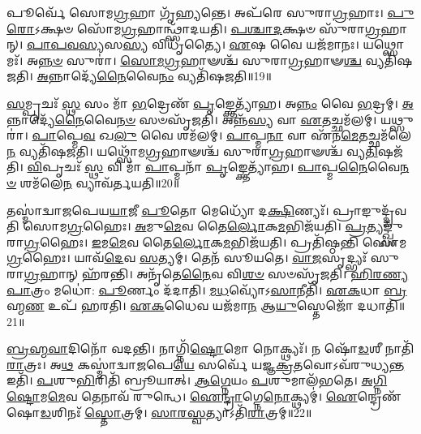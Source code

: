 𑌪𑍂𑌰𑍍𑌵𑍇᳴ 𑌸𑍋𑌮\-\ul{𑌗𑍍𑌰}\-𑌹𑌾 𑌗𑍃᳴𑌹𑍍𑌯𑌨𑍍𑌤𑍇।
𑌅𑌪᳴𑌰𑍇 𑌸𑍁𑌰𑌾\-\ul{𑌗𑍍𑌰}\-𑌹𑌾𑌃।
\-\ul{𑌪𑍁}\-\-\ul{𑌰𑍋}\-\-𑌽𑌕𑍍𑌷𑍞 𑌸𑍋᳴𑌮\-\ul{𑌗𑍍𑌰}\-𑌹𑌾𑌨𑍍𑌥𑍍𑌸𑌾᳴𑌦𑌯𑌤𑌿।
\-\ul{𑌪}\-\-\ul{𑌶𑍍𑌚𑌾}\-\-\ul{𑌦}\-𑌕𑍍𑌷𑍞 𑌸𑍁᳴𑌰𑌾\-\ul{𑌗𑍍𑌰}\-𑌹𑌾𑌨𑍍।
\-\ul{𑌪𑌾}\-\-\ul{𑌪}\-\-\ul{𑌵}\-\-\ul{𑌸𑍍𑌯}\-𑌸\-\ul{𑌸𑍍𑌯} 𑌵𑌿𑌧𑍃᳴𑌤𑍍𑌯𑍈।
\-\ul{𑌏}\-𑌷 𑌵𑍈 𑌯𑌜᳴𑌮𑌾𑌨𑌃।
𑌯𑌥𑍍𑌸𑍋𑌮𑌃᳴।
𑌅\-\ul{𑌨𑍍𑌨}\-\-\ul{𑍞} 𑌸𑍁𑌰𑌾॑।
\-\ul{𑌸𑍋}\-\-\ul{𑌮}\-\-\ul{𑌗𑍍𑌰}\-𑌹𑌾𑍟𑌶𑍍𑌚᳴ 𑌸𑍁𑌰𑌾\-\ul{𑌗𑍍𑌰}\-𑌹𑌾𑍟\-\ul{𑌶𑍍𑌚} 𑌵𑍍𑌯𑌤𑌿᳴𑌷𑌜𑌤𑌿।
\-\ul{𑌅}\-𑌨𑍍𑌨𑌾𑌦𑍍𑌯𑍇᳴\-\ul{𑌨𑍈}\-𑌵𑍈\-\ul{𑌨𑌂} 𑌵𑍍𑌯𑌤𑌿᳴𑌷𑌜𑌤𑌿॥19॥

\-\ul{𑌸}\-𑌮𑍍𑌪𑍃𑌚𑌃᳴ \ul{𑌸𑍍𑌥} 𑌸𑌂 𑌮𑌾᳴ \ul{𑌭}\-𑌦𑍍𑌰𑍇𑌣᳴ \ul{𑌪𑍃}\-𑌙𑍍𑌕𑍍𑌤𑍇𑌤𑍍𑌯𑌾᳴𑌹।
𑌅\-\ul{𑌨𑍍𑌨𑌂} 𑌵𑍈 \ul{𑌭}\-𑌦𑍍𑌰𑌮𑍍।
\-\ul{𑌅}\-𑌨𑍍𑌨𑌾𑌦𑍍𑌯𑍇᳴\-\ul{𑌨𑍈}\-𑌵𑍈\-\ul{𑌨}\-\-\ul{𑍞} 𑌸𑍞𑌸𑍃᳴𑌜𑌤𑌿।
𑌅𑌨𑍍𑌨᳴\-\ul{𑌸𑍍𑌯} 𑌵𑌾 \ul{𑌏}\-𑌤𑌚𑍍𑌛𑌮᳴𑌲𑌮𑍍।
𑌯𑌥𑍍𑌸𑍁𑌰𑌾॑।
\-\ul{𑌪𑌾}\-𑌪𑍍𑌮𑍇\-\ul{𑌵} 𑌖\-\ul{𑌲𑍁} 𑌵𑍈 𑌶𑌮᳴𑌲𑌮𑍍।
\-\ul{𑌪𑌾}\-𑌪𑍍𑌮\-\ul{𑌨𑌾} 𑌵𑌾 𑌏᳴𑌨\-\ul{𑌮𑍇}\-𑌤𑌚𑍍𑌛𑌮᳴𑌲𑍇\-\ul{𑌨} 𑌵𑍍𑌯𑌤𑌿᳴𑌷𑌜𑌤𑌿।
𑌯𑌥𑍍𑌸𑍋᳴𑌮\-\ul{𑌗𑍍𑌰}\-𑌹𑌾𑍟𑌶𑍍𑌚᳴ 𑌸𑍁𑌰𑌾\-\ul{𑌗𑍍𑌰}\-𑌹𑌾𑍟𑌶𑍍𑌚᳴ 𑌵𑍍𑌯\-\ul{𑌤𑌿}\-𑌷𑌜᳴𑌤𑌿।
\-\ul{𑌵𑌿}\-𑌪𑍃𑌚𑌃᳴ \ul{𑌸𑍍𑌥} 𑌵𑌿 𑌮𑌾᳴ \ul{𑌪𑌾}\-𑌪𑍍𑌮𑌨𑌾᳴ \ul{𑌪𑍃}\-𑌙𑍍𑌕𑍍𑌤𑍇𑌤𑍍𑌯𑌾᳴𑌹।
\-\ul{𑌪𑌾}\-𑌪𑍍𑌮\-\ul{𑌨𑍈}\-𑌵𑍈\-\ul{𑌨}\-\-\ul{𑍞} 𑌶𑌮᳴𑌲𑍇\-\ul{𑌨} 𑌵𑍍𑌯𑌾𑌵᳴𑌰𑍍𑌤𑌯𑌤𑌿॥20॥

𑌤𑌸𑍍𑌮𑌾॑𑌦𑍍𑌵𑌾𑌜𑌪𑍇𑌯\-\ul{𑌯𑌾}\-𑌜𑍀 \ul{𑌪𑍂}\-𑌤𑍋 𑌮𑍇𑌧𑍍𑌯𑍋᳴ 𑌦\-\ul{𑌕𑍍𑌷𑌿}\-𑌣𑍍𑌯𑌃᳴।
𑌪𑍍𑌰𑌾𑌙𑍁𑌦𑍍𑌦𑍍𑌰᳴𑌵𑌤𑌿 𑌸𑍋𑌮\-\ul{𑌗𑍍𑌰}\-𑌹𑍈𑌃।
\-\ul{𑌅}\-𑌮𑍁\-\ul{𑌮𑍇}\-𑌵 𑌤𑍈\-\ul{𑌰𑍍𑌲𑍋}\-𑌕\-\ul{𑌮}\-𑌭𑌿𑌜᳴𑌯𑌤𑌿।
\-\ul{𑌪𑍍𑌰}\-𑌤𑍍𑌯𑌙𑍍𑌖𑍍𑌸𑍁᳴𑌰𑌾\-\ul{𑌗𑍍𑌰}\-𑌹𑍈𑌃।
\-\ul{𑌇}\-𑌮\-\ul{𑌮𑍇}\-𑌵 𑌤𑍈\-\ul{𑌰𑍍𑌲𑍋}\-𑌕\-\ul{𑌮}\-𑌭𑌿𑌜᳴𑌯𑌤𑌿।
𑌪𑍍𑌰𑌤𑌿᳴\-𑌷𑍍𑌠𑌨𑍍𑌤𑌿 𑌸𑍋𑌮\-\ul{𑌗𑍍𑌰}\-𑌹𑍈𑌃।
𑌯𑌾𑌵᳴\-\ul{𑌦𑍇}\-𑌵 \ul{𑌸}\-𑌤𑍍𑌯𑌮𑍍।
𑌤𑍇𑌨᳴ 𑌸𑍂𑌯𑌤𑍇।
\-\ul{𑌵𑌾}\-\-\ul{𑌜}\-𑌸𑍃𑌦𑍍𑌭𑍍𑌯𑌃᳴ 𑌸𑍁𑌰𑌾\-\ul{𑌗𑍍𑌰}\-𑌹𑌾𑌨𑍍 𑌹᳴𑌰𑌨𑍍𑌤𑌿।
𑌅𑌨𑍃᳴𑌤𑍇\-\ul{𑌨𑍈}\-𑌵 𑌵𑌿\-\ul{𑌶}\-\-\ul{𑍞} 𑌸𑍞𑌸𑍃᳴𑌜𑌤𑌿।
\-\ul{𑌹𑌿}\-\-\ul{𑌰}\-\-\ul{𑌣𑍍𑌯}\-\-\ul{𑌪𑌾}\-𑌤𑍍𑌰𑌂 𑌮𑌧𑍋॑: \ul{𑌪𑍂}\-𑌰𑍍𑌣𑌂 𑌦᳴𑌦𑌾𑌤𑌿।
\-\ul{𑌮}\-\-\ul{𑌧}\-𑌵𑍍𑌯𑍋᳴\-𑌽\-\ul{𑌸𑌾}\-𑌨𑍀𑌤𑌿᳴।
\-\ul{𑌏}\-\-\ul{𑌕}\-𑌧𑌾 \ul{𑌬𑍍𑌰}\-𑌹𑍍𑌮\-\ul{𑌣} 𑌉𑌪᳴ 𑌹𑌰𑌤𑌿।
\-\ul{𑌏}\-\-\ul{𑌕}\-𑌧𑍈𑌵 𑌯𑌜᳴𑌮𑌾\-\ul{𑌨} 𑌆\-\ul{𑌯𑍁}\-𑌸𑍍𑌤𑍇𑌜𑍋᳴ 𑌦𑌧𑌾𑌤𑌿॥21॥\anuvakamend[\-\ul{𑌆}\-𑌪𑍍𑌤𑍍𑌵𑌾\-𑌽𑌵᳴ 𑌰𑍁\-\ul{𑌨𑍍𑌧𑍇} 𑌸𑍋\-\ul{𑌮𑌃} 𑌶𑌮᳴\-\ul{𑌲𑌂} 𑌯𑌥𑍍𑌸𑍁\-\ul{𑌰𑌾} 𑌹𑍍𑌯᳴𑌸𑍍𑌯𑍈\-\ul{𑌨𑌂} 𑌵𑍍𑌯𑌤𑌿᳴𑌷𑌜\-\ul{𑌤𑌿} 𑌵𑍍𑌯𑌾𑌵᳴𑌰𑍍𑌤𑌯𑌤𑌿 𑌸𑍃𑌜𑌤𑌿 \ul{𑌚}\-𑌤𑍍𑌵𑌾𑌰𑌿᳴ 𑌚]

\-\ul{𑌬𑍍𑌰}\-\-\ul{𑌹𑍍𑌮}\-\-\ul{𑌵𑌾}\-𑌦𑌿𑌨𑍋᳴ 𑌵𑌦𑌨𑍍𑌤𑌿।
𑌨𑌾𑌗𑍍𑌨𑌿᳴\-\ul{𑌷𑍍𑌟𑍋}\-𑌮𑍋 𑌨𑍋𑌕𑍍𑌥𑍍𑌯𑌃᳴।
𑌨 𑌷𑍋᳴\-\ul{𑌡}\-𑌶𑍀 𑌨𑌾𑌤𑌿᳴\-\ul{𑌰𑌾}\-𑌤𑍍𑌰𑌃।
𑌅\-\ul{𑌥} 𑌕𑌸𑍍𑌮𑌾॑𑌦𑍍𑌵𑌾\-\ul{𑌜}\-𑌪𑍇\-\ul{𑌯𑍇} 𑌸𑌰𑍍𑌵𑍇᳴ 𑌯𑌜𑍍𑌞\-\ul{𑌕𑍍𑌰}\-𑌤𑌵𑍋\-𑌽𑌵᳴𑌰𑍁𑌧𑍍𑌯\-\ul{𑌨𑍍𑌤} 𑌇𑌤𑌿᳴।
\-\ul{𑌪}\-𑌶𑍁\-\ul{𑌭𑌿}\-𑌰𑌿𑌤𑌿᳴ 𑌬𑍍𑌰𑍂𑌯𑌾𑌤𑍍।
\-\ul{𑌆}\-\-\ul{𑌗𑍍𑌨𑍇}\-𑌯𑌂 \ul{𑌪}\-𑌶𑍁𑌮𑌾𑌲᳴𑌭𑌤𑍇।
\-\ul{𑌅}\-\-\ul{𑌗𑍍𑌨𑌿}\-\-\ul{𑌷𑍍𑌟𑍋}\-𑌮\-\ul{𑌮𑍇}\-𑌵 𑌤𑍇𑌨𑌾𑌵᳴ 𑌰𑍁𑌨𑍍𑌧𑍇।
\-\ul{𑌐}\-\-\ul{𑌨𑍍𑌦𑍍𑌰𑌾}\-𑌗𑍍𑌨𑍇\-\ul{𑌨𑍋}\-𑌕𑍍𑌥𑍍𑌯𑌮𑍍॑।
\-\ul{𑌐}\-𑌨𑍍𑌦𑍍𑌰𑍇𑌣᳴ 𑌷𑍋\-\ul{𑌡}\-𑌶𑌿𑌨𑌃᳴ \ul{𑌸𑍍𑌤𑍋}\-𑌤𑍍𑌰𑌮𑍍।
\-\ul{𑌸𑌾}\-\-\ul{𑌰}\-\-\ul{𑌸𑍍𑌵}\-𑌤𑍍𑌯𑌾\-𑌽𑌤𑌿᳴\-\ul{𑌰𑌾}\-𑌤𑍍𑌰𑌮𑍍॥22॥

